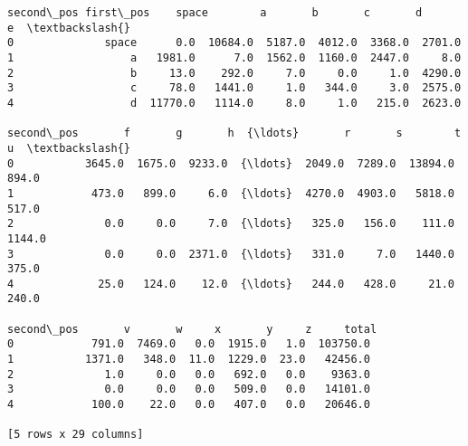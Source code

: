 \documentclass[11pt]{article}
\makeatletter
\newcommand{\boxspacing}{\kern\kvtcb@left@rule\kern\kvtcb@boxsep}
\newcommand{\prompt}[4]{
        \ttfamily\llap{{\color{#2}[#3]:\hspace{3pt}#4}}\vspace{-\baselineskip}
    }
\makeatother
\begin{document}
            \begin{tcolorbox}[breakable, size=fbox, boxrule=.5pt, pad at break*=1mm, opacityfill=0]
\prompt{Out}{outcolor}{13}{\boxspacing}
\begin{Verbatim}[commandchars=\\\{\}]
second\_pos first\_pos    space        a       b       c       d       e  \textbackslash{}
0              space      0.0  10684.0  5187.0  4012.0  3368.0  2701.0
1                  a   1981.0      7.0  1562.0  1160.0  2447.0     8.0
2                  b     13.0    292.0     7.0     0.0     1.0  4290.0
3                  c     78.0   1441.0     1.0   344.0     3.0  2575.0
4                  d  11770.0   1114.0     8.0     1.0   215.0  2623.0

second\_pos       f       g       h  {\ldots}       r       s        t       u  \textbackslash{}
0           3645.0  1675.0  9233.0  {\ldots}  2049.0  7289.0  13894.0   894.0
1            473.0   899.0     6.0  {\ldots}  4270.0  4903.0   5818.0   517.0
2              0.0     0.0     7.0  {\ldots}   325.0   156.0    111.0  1144.0
3              0.0     0.0  2371.0  {\ldots}   331.0     7.0   1440.0   375.0
4             25.0   124.0    12.0  {\ldots}   244.0   428.0     21.0   240.0

second\_pos       v       w     x       y     z     total
0            791.0  7469.0   0.0  1915.0   1.0  103750.0
1           1371.0   348.0  11.0  1229.0  23.0   42456.0
2              1.0     0.0   0.0   692.0   0.0    9363.0
3              0.0     0.0   0.0   509.0   0.0   14101.0
4            100.0    22.0   0.0   407.0   0.0   20646.0

[5 rows x 29 columns]
\end{Verbatim}
\end{tcolorbox}
        
\end{document}
